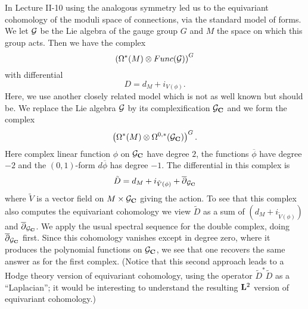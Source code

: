 In Lecture II-10  using the analogous symmetry led us to the
equivariant cohomology of the 
moduli space of connections, via the standard model of forms.  We let
${\cal G}$ be the Lie algebra of the gauge group $G$
and $M$ the space on which this group acts. Then we have the complex
$$\left(\Omega^*(M)\otimes Func({\cal G})\right)^G$$
with differential
$$D=d_M+i_{V(\phi)}.$$
Here, we use another closely related model which is not as well known
but should be.
We replace the Lie algebra ${\cal G}$ by its complexification ${\cal
G}_{\bf C}$ and we form the complex
$$\left(\Omega^*(M)\otimes \Omega^{0,*}({\cal G}_{\bf C})\right)^G.$$
Here complex linear function $\phi$ on ${\cal G}_{\bf C}$ have degree
$2$, the functions $\overline\phi$ have degree $-2$ and the
$(0,1)$-form $d\overline\phi$ has degree $-1$. The differential in
this complex is
$$\tilde D=d_M+i_{\tilde V(\phi)}+\overline\partial_{{\cal G}_{\bf
C}}$$
where $\tilde V$ is a vector field on $M\times {\cal G}_{\bf C}$
giving the action. To see that this complex also computes the
equivariant cohomology we view $\tilde D$ as a sum of  $(d_M+i_{\tilde
V(\phi)})$ and $\overline\partial_{{\cal G}_{\bf C}}$. We apply the
usual spectral sequence for the double complex, doing
$\overline\partial_{{\cal G}_{\bf C}}$ first.
Since this cohomology vanishes except in degree zero, where it
produces the polynomial functions on ${\cal G}_{\bf C}$, we see that
one recovers the same answer as for the first complex.
(Notice that this second approach leads to a Hodge theory
version of equivariant cohomology, using the operator $\tilde D^*\tilde D$
as a ``Laplacian''; it would be interesting to understand
 the resulting ${\bf L}^2$  version of equivariant cohomology.)


